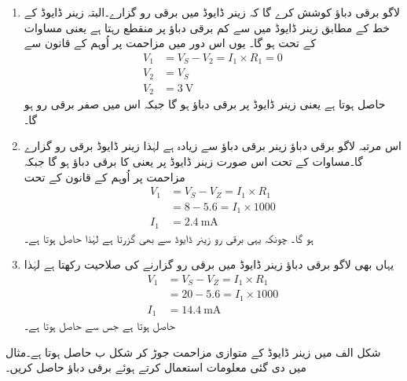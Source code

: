 \begin{enumerate}
\item
لاگو برقی دباؤ  کوشش کرے گا کہ زینر ڈایوڈ میں برقی رو گزارے۔البتہ زینر ڈایوڈ کے خط کے مطابق زینر ڈایوڈ میں  سے کم برقی دباؤ پر منقطع رہتا ہے یعنی مساوات   کے تحت   ہو گا۔
یوں اس دور میں مزاحمت  پر  اُوہم کے قانون سے
\begin{align*}
V_1 &=V_S-V_2=I_1 \times R_1 = 0\\
V_2 &=V_S\\
V_2&=\SI{3}{\volt}
\end{align*}
حاصل ہوتا ہے یعنی زینر ڈایوڈ پر   برقی دباؤ ہو گا جبکہ اس میں صفر برقی  رو ہو گا۔
\item
	اس مرتبہ لاگو برقی دباؤ زینر برقی دباؤ سے زیادہ ہے لہٰذا زینر ڈایوڈ برقی رو گزارے گا۔مساوات    کے تحت اس صورت زینر ڈایوڈ پر  یعنی  کا برقی دباؤ ہو گا جبکہ مزاحمت پر  اُوہم کے قانون کے تحت
\begin{align*}
V_1&=V_S-V_Z =I_1 \times R_1\\
&=8-5.6=I_1 \times 1000\\
I_1&=\SI{2.4}{\milli \ampere}
\end{align*}
ہو گا۔ چونکہ یہی برقی رو زینر ڈایوڈ سے بھی گزرتا ہے لہٰذا   حاصل ہوتا ہے۔
\item
یہاں بھی لاگو برقی دباؤ زینر ڈایوڈ میں برقی رو گزارنے کی صلاحیت رکھتا ہے لہٰذا
\begin{align*}
V_1&=V_S-V_Z =I_1 \times R_1\\
&=20-5.6=I_1 \times 1000\\
I_1&=\SI{14.4}{\milli \ampere}
\end{align*}
حاصل ہوتا ہے جس سے   حاصل ہوتا ہے۔
\end{enumerate}


شکل  الف میں زینر ڈایوڈ کے متوازی مزاحمت  جوڑ کر شکل  ب حاصل ہوتا ہے۔مثال   میں دی گئی  معلومات استعمال کرتے ہوئے برقی دباؤ  حاصل کریں۔

